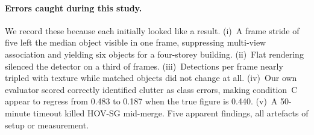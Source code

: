 \documentclass[11pt,a4paper]{article}
\begin{document}
\paragraph{Errors caught during this study.} We record these because each
initially looked like a result. (i)~A frame stride of five left the median object
visible in one frame, suppressing multi-view association and yielding six
objects for a four-storey building. (ii)~Flat rendering silenced the detector on
a third of frames. (iii)~Detections per frame nearly tripled with texture while
matched objects did not change at all. (iv)~Our own evaluator scored correctly
identified clutter as class errors, making condition~C appear to regress from
0.483 to 0.187 when the true figure is 0.440. (v)~A 50-minute timeout killed
HOV-SG mid-merge. Five apparent findings, all artefacts of setup or measurement.
\end{document}
